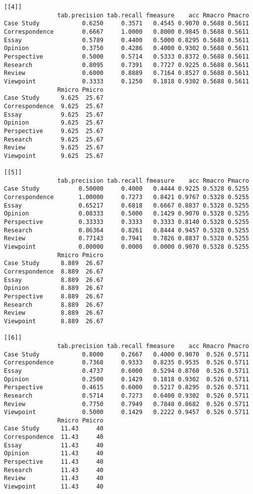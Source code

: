 \documentclass[]{article}
\begin{document}
\begin{lstlisting}[frame=single]
[[4]]
               tab.precision tab.recall fmeasure    acc Rmacro Pmacro
Case Study            0.6250     0.3571   0.4545 0.9070 0.5688 0.5611
Correspondence        0.6667     1.0000   0.8000 0.9845 0.5688 0.5611
Essay                 0.5789     0.4400   0.5000 0.8295 0.5688 0.5611
Opinion               0.3750     0.4286   0.4000 0.9302 0.5688 0.5611
Perspective           0.5000     0.5714   0.5333 0.8372 0.5688 0.5611
Research              0.8095     0.7391   0.7727 0.9225 0.5688 0.5611
Review                0.6000     0.8889   0.7164 0.8527 0.5688 0.5611
Viewpoint             0.3333     0.1250   0.1818 0.9302 0.5688 0.5611
               Rmicro Pmicro
Case Study      9.625  25.67
Correspondence  9.625  25.67
Essay           9.625  25.67
Opinion         9.625  25.67
Perspective     9.625  25.67
Research        9.625  25.67
Review          9.625  25.67
Viewpoint       9.625  25.67

[[5]]
               tab.precision tab.recall fmeasure    acc Rmacro Pmacro
Case Study           0.50000     0.4000   0.4444 0.9225 0.5328 0.5255
Correspondence       1.00000     0.7273   0.8421 0.9767 0.5328 0.5255
Essay                0.65217     0.6818   0.6667 0.8837 0.5328 0.5255
Opinion              0.08333     0.5000   0.1429 0.9070 0.5328 0.5255
Perspective          0.33333     0.3333   0.3333 0.8140 0.5328 0.5255
Research             0.86364     0.8261   0.8444 0.9457 0.5328 0.5255
Review               0.77143     0.7941   0.7826 0.8837 0.5328 0.5255
Viewpoint            0.00000     0.0000   0.0000 0.9070 0.5328 0.5255
               Rmicro Pmicro
Case Study      8.889  26.67
Correspondence  8.889  26.67
Essay           8.889  26.67
Opinion         8.889  26.67
Perspective     8.889  26.67
Research        8.889  26.67
Review          8.889  26.67
Viewpoint       8.889  26.67

[[6]]
               tab.precision tab.recall fmeasure    acc Rmacro Pmacro
Case Study            0.8000     0.2667   0.4000 0.9070  0.526 0.5711
Correspondence        0.7368     0.9333   0.8235 0.9535  0.526 0.5711
Essay                 0.4737     0.6000   0.5294 0.8760  0.526 0.5711
Opinion               0.2500     0.1429   0.1818 0.9302  0.526 0.5711
Perspective           0.4615     0.6000   0.5217 0.8295  0.526 0.5711
Research              0.5714     0.7273   0.6400 0.9302  0.526 0.5711
Review                0.7750     0.7949   0.7848 0.8682  0.526 0.5711
Viewpoint             0.5000     0.1429   0.2222 0.9457  0.526 0.5711
               Rmicro Pmicro
Case Study      11.43     40
Correspondence  11.43     40
Essay           11.43     40
Opinion         11.43     40
Perspective     11.43     40
Research        11.43     40
Review          11.43     40
Viewpoint       11.43     40


\end{lstlisting}
\end{document}
